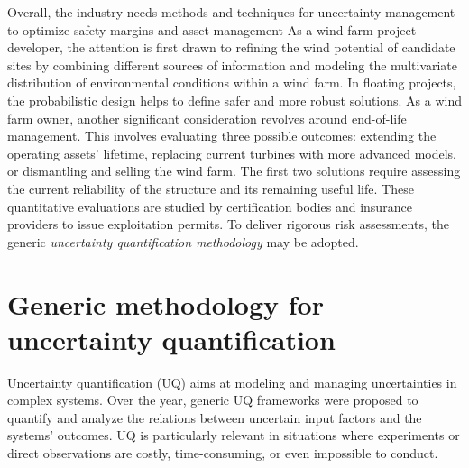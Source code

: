 
Overall, the industry needs methods and techniques for uncertainty management to optimize safety margins and asset management
As a wind farm project developer, the attention is first drawn to refining the wind potential of candidate sites by combining different sources of information and 
modeling the multivariate distribution of environmental conditions within a wind farm. 
In floating projects, the probabilistic design helps to define safer and more robust solutions. 
As a wind farm owner, another significant consideration revolves around end-of-life management. 
This involves evaluating three possible outcomes: extending the operating assets' lifetime, replacing current turbines with more advanced models, or dismantling and selling the wind farm. 
The first two solutions require assessing the current reliability of the structure and its remaining useful life. 
These quantitative evaluations are studied by certification bodies and insurance providers to issue exploitation permits.
To deliver rigorous risk assessments, the generic \textit{uncertainty quantification methodology} may be adopted.

\section*{Generic methodology for uncertainty quantification}

Uncertainty quantification (\acrshort{UQ}) aims at modeling and managing uncertainties in complex systems.
Over the year, generic UQ frameworks were proposed \citep{rocquigny_2008} to quantify and analyze the relations between uncertain input factors and the systems' outcomes. 
UQ is particularly relevant in situations where experiments or direct observations are costly, time-consuming, or even impossible to conduct.

